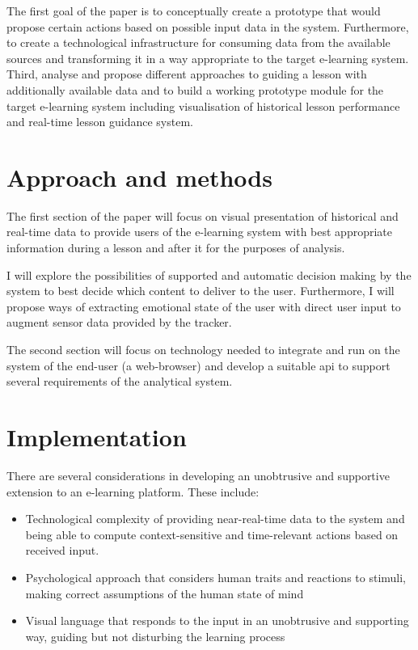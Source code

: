 The first goal of the paper is to conceptually create a prototype that would propose certain actions based on possible input data in the system. Furthermore, to create a technological infrastructure for consuming data from the available sources and transforming it in a way appropriate to the target e-learning system. Third, analyse and propose different approaches to guiding a lesson with additionally available data and to build a working prototype module for the target e-learning system including visualisation of historical lesson performance and real-time lesson guidance system.

\section{Approach and methods}

The first section of the paper will focus on visual presentation of historical and real-time data to provide users of the e-learning system with best appropriate information during a lesson and after it for the purposes of analysis.

I will explore the possibilities of supported and automatic decision making by the system to best decide which content to deliver to the user. Furthermore, I will propose ways of extracting emotional state of the user with direct user input to augment sensor data provided by the tracker.

The second section will focus on technology needed to integrate and run on the system of the end-user (a web-browser) and develop a suitable api to support several requirements of the analytical system.

\section{Implementation}

There are several considerations in developing an unobtrusive and supportive extension to an e-learning platform. These include:

\begin{itemize}
	\item Technological complexity of providing near-real-time data to the system and being able to compute context-sensitive and time-relevant actions based on received input.
	\item Psychological approach that considers human traits and reactions to stimuli, making correct assumptions of the human state of mind
	\item Visual language that responds to the input in an unobtrusive and supporting way, guiding but not disturbing the learning process
\end{itemize}

